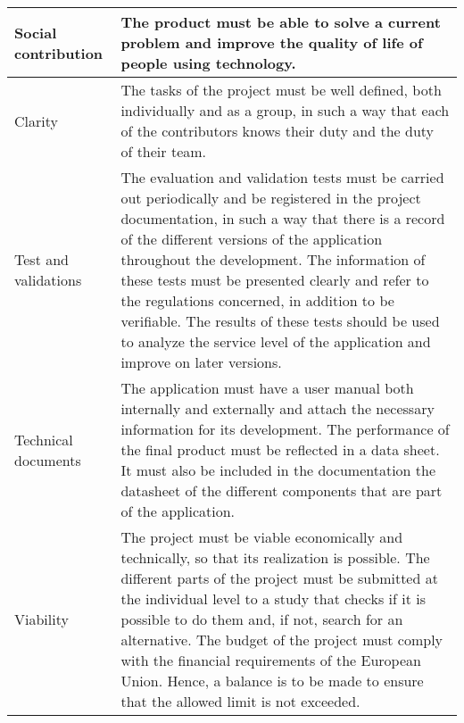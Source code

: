 \begin{longtable}[H]{lp{10.2cm}}
	\midrule	
	
	Social contribution & The product must be able to solve a current problem and improve the quality of life of people using technology.\vspace{0.2cm} \\
	
	\midrule
	
	Clarity & The tasks of the project must be well defined, both individually and as a group, in such a way that each of the contributors knows their duty and the duty of their team.\vspace{0.2cm} \\
	
	\midrule
	
	Test and validations & The evaluation and validation tests must be carried out periodically and be registered in the project documentation, in such a way that there is a record of the different versions of the application throughout the development.\vspace{0.2cm}
	\newline
	The information of these tests must be presented clearly and refer to the regulations concerned, in addition to be verifiable.\vspace{0.2cm}
	\newline
	The results of these tests should be used to analyze the service level of the application and improve on later versions.\vspace{0.2cm} \\
	
	\midrule
	
	Technical documents & The application must have a user manual both internally and externally and attach the necessary information for its development.\vspace{0.2cm}
	\newline
	The performance of the final product must be reflected in a data sheet. It must also be included in the documentation the datasheet of the different components that are part of the application.\vspace{0.2cm} \\
	
	\midrule
	
	Viability & The project must be viable economically and technically, so that its realization is possible.\vspace{0.2cm}
	\newline
	The different parts of the project must be submitted at the individual level to a study that checks if it is possible to do them and, if not, search for an alternative.\vspace{0.2cm}
	\newline
	The budget of the project must comply with the financial requirements of the European Union. Hence, a balance is to be made to ensure that the allowed limit is not exceeded.\vspace{0.2cm}\\
	

\end{longtable}
